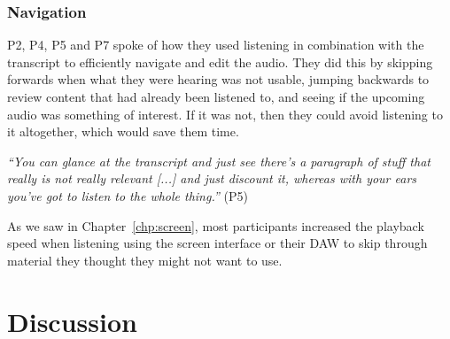 \subsubsection{Navigation}



P2, P4, P5 and P7 spoke of how they used listening in combination with the transcript to efficiently navigate and edit
the audio. They did this by skipping forwards when what they were hearing was not usable, jumping backwards to review
content that had already been listened to, and seeing if the upcoming audio was something of interest.  If it was not,
then they could avoid listening to it altogether, which would save them time.

\textit{``You can glance at the transcript and just see there's a paragraph of stuff that really is not really relevant
[...] and just discount it, whereas with your ears you've got to listen to the whole thing.''} (P5) 

As we saw in Chapter~\ref{chp:screen}, most participants increased the playback speed when listening using the screen
interface or their DAW to skip through material they thought they might not want to use.




\section{Discussion}\label{sec:paper-discussion}



